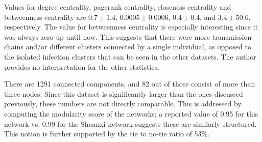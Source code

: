 Values for degree centrality, pagerank centrality, closeness centrality and betweenness centrality are $0.7\pm1.4$, $0.0005\pm0.0006$, $0.4\pm0.4$, and $3.4\pm50.6$, respectively. The value for betweenness centrality is especially interesting since it was always zero up until now. This suggests that there were more transmission chains and/or different clusters connected by a single individual, as opposed to the isolated infection clusters that can be seen in the other datasets. The author provides no interpretation for the other statistics.

There are 1291 connected components, and 82 out of those consist of more than three nodes. Since this dataset is significantly larger than the ones discussed previously, these numbers are not directly comparable. This is addressed by computing the modularity score of the networks; a reported value of 0.95 for this network vs. 0.99 for the Shaanxi network suggests these are similarly structured. This notion is further supported by the tie to no-tie ratio of 53\%.

